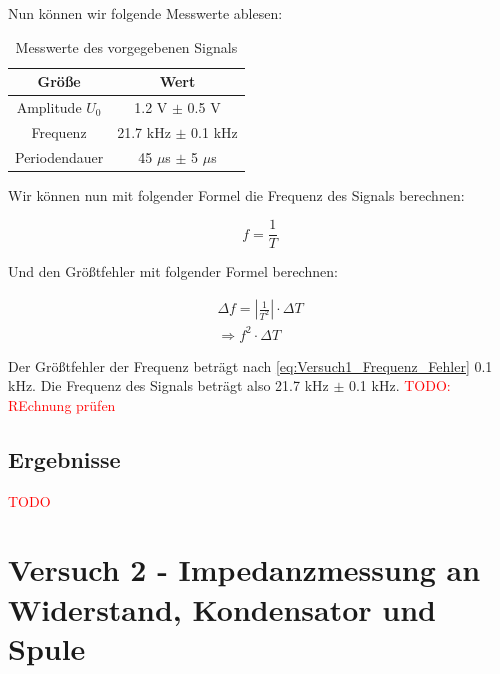     Nun können wir folgende Messwerte ablesen:
    \begin{table}[H]
        \centering
        \caption{Messwerte des vorgegebenen Signals}
        \vspace{0.5em}
        \begin{tabular}{|c|c|}
            \hline
            \textbf{Größe} & \textbf{Wert} \\
            \hline
            Amplitude $U_0$ & 1.2 V $\pm$ 0.5 V \\
            \hline
            Frequenz & 21.7 kHz $\pm$ 0.1 kHz\\
            \hline
            Periodendauer & 45 $\mu$s $\pm$ 5 $\mu$s \\
            \hline
        \end{tabular}
        
        \label{tab:Versuch1_Messwerte}
    \end{table}
    
    Wir können nun mit folgender Formel die Frequenz des Signals berechnen:

    \begin{equation}
        f = \frac{1}{T}
        \label{eq:Versuch1_Frequenz}
    \end{equation}

    Und den Größtfehler mit folgender Formel berechnen:

    \begin{equation}
        \begin{aligned}
            \Delta f = \left |\frac{1}{T^2} \right | \cdot \Delta T \\
            \Rightarrow f^2 \cdot \Delta T
        \label{eq:Versuch1_Frequenz_Fehler}
        \end{aligned}
    \end{equation}
        
    Der Größtfehler der Frequenz beträgt nach \ref{eq:Versuch1_Frequenz_Fehler} 0.1 kHz. Die Frequenz des Signals beträgt also 21.7 kHz $\pm$ 0.1 kHz. \textcolor{red}{TODO: REchnung prüfen}
    
    \subsection{Ergebnisse}
    \textcolor{red}{TODO}


\section{Versuch 2 - Impedanzmessung an Widerstand, Kondensator und Spule}
    
